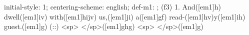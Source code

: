 initial-style: 1;
centering-scheme: english;
def-m1: \grealign;
(f3) 1. And([em1]h) dwell([em1]iv) with([em1]hijv) us,([em1]ji) a([em1]gf) read-([em1]hv)y([em1]ih) guest.([em1]g) (::) <sp> </sp>([em1]ghg) <sp> </sp>([em1]g)